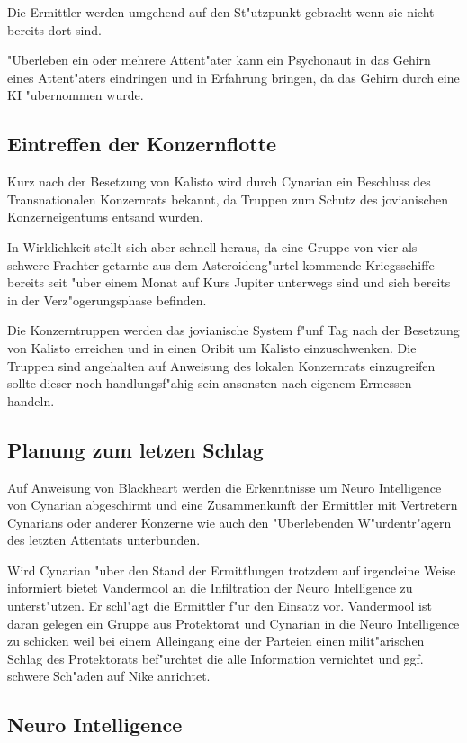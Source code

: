 Die Ermittler werden umgehend auf den St"utzpunkt gebracht wenn sie nicht bereits dort sind.

"Uberleben ein oder mehrere Attent"ater kann ein Psychonaut in das Gehirn eines Attent"aters eindringen und in Erfahrung bringen, da\3 das Gehirn durch eine KI "ubernommen wurde.

\subsection{Eintreffen der Konzernflotte}

Kurz nach der Besetzung von Kalisto wird durch Cynarian ein Beschluss des Transnationalen Konzernrats bekannt, da\3 Truppen zum Schutz des jovianischen Konzerneigentums entsand wurden.

In Wirklichkeit stellt sich aber schnell heraus, da\3 eine Gruppe von vier als schwere Frachter getarnte aus dem Asteroideng"urtel kommende Kriegsschiffe bereits seit "uber einem Monat auf Kurs Jupiter unterwegs sind und sich bereits in der Verz"ogerungsphase befinden.

Die Konzerntruppen werden das jovianische System f"unf Tag nach der Besetzung von Kalisto erreichen und in einen Oribit um Kalisto einzuschwenken. Die Truppen sind angehalten auf Anweisung des lokalen Konzernrats einzugreifen sollte dieser noch handlungsf"ahig sein ansonsten nach eigenem Ermessen handeln.

\subsection{Planung zum letzen Schlag}

Auf Anweisung von Blackheart werden die Erkenntnisse um Neuro Intelligence von Cynarian abgeschirmt und eine Zusammenkunft der Ermittler mit Vertretern Cynarians oder anderer Konzerne wie auch den "Uberlebenden W"urdentr"agern des letzten Attentats unterbunden.

Wird Cynarian "uber den Stand der Ermittlungen trotzdem auf irgendeine Weise informiert bietet Vandermool an die Infiltration der Neuro Intelligence zu unterst"utzen. Er schl"agt die Ermittler f"ur den Einsatz vor. Vandermool ist daran gelegen ein Gruppe aus Protektorat und Cynarian in die Neuro Intelligence zu schicken weil bei einem Alleingang
eine der Parteien einen milit"arischen Schlag des Protektorats bef"urchtet die alle Information vernichtet und ggf.
schwere Sch"aden auf Nike anrichtet.

\subsection{Neuro Intelligence}

